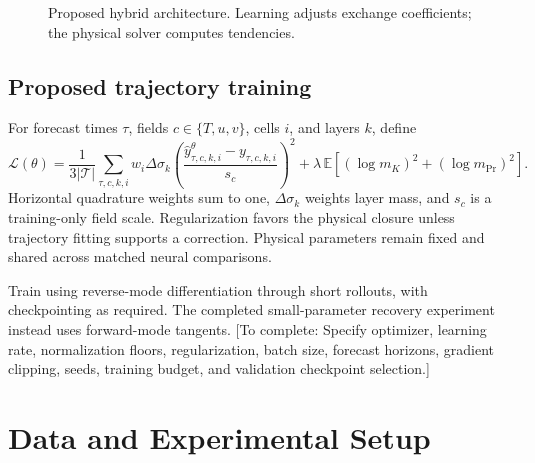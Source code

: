 \documentclass{article}
\newcommand{\pending}[1]{\textcolor{blue!65!black}{[To complete: #1]}}
\begin{document}
\begin{figure}[t]
\centering
{}
\caption{Proposed hybrid architecture. Learning adjusts exchange coefficients;
the physical solver computes tendencies.}
\end{figure}

\subsection{Proposed trajectory training}
For forecast times \(\tau\), fields \(c\in\{T,u,v\}\), cells \(i\), and layers
\(k\), define
\begin{equation}
\mathcal L(\theta)=\frac{1}{3|\mathcal T|}
\sum_{\tau,c,k,i}w_i\Delta\sigma_k
\left(\frac{\hat y^\theta_{\tau,c,k,i}-y_{\tau,c,k,i}}{s_c}\right)^2
+\lambda\,\mathbb E[(\log m_K)^2+(\log m_{\mathrm{Pr}})^2].
\end{equation}
Horizontal quadrature weights sum to one, \(\Delta\sigma_k\) weights layer
mass, and \(s_c\) is a training-only field scale. Regularization favors the
physical closure unless trajectory fitting supports a correction. Physical
parameters remain fixed and shared across matched neural comparisons.

Train using reverse-mode differentiation through short rollouts, with
checkpointing as required. The completed small-parameter recovery experiment
instead uses forward-mode tangents.
\pending{Specify optimizer, learning rate, normalization floors, regularization,
batch size, forecast horizons, gradient clipping, seeds, training budget,
and validation checkpoint selection.}

\section{Data and Experimental Setup}
\end{document}
